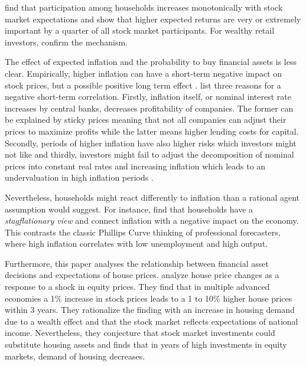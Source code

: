 \documentclass[ProjectABM]{subfiles}
\begin{document}
\cite{arrondel_et_al_2014subjective_return_expectation} find that participation among households increases monotonically with stock market expectations and \cite{choi_2020} show that higher expected returns are very or extremely important by a quarter of all stock market participants. For wealthy retail investors, \cite{giglio_et_al_2019five} confirm the mechanism.

The effect of expected inflation and the probability to buy financial assets is less clear. Empirically, higher inflation can have a short-term negative impact on stock prices, but a possible positive long term effect \citep{anari_kolari_2001inflation}. \cite{campbell_vuolteenaho_2004inflation} list three reasons for a negative short-term correlation. Firstly, inflation itself, or nominal interest rate increases by central banks, decreases profitability of companies. The former can be explained by sticky prices meaning that not all companies can adjust their prices to maximize profits while the latter means higher lending costs for capital. Secondly, periods of higher inflation have also higher risks which investors might not like and thirdly, investors might fail to adjust the decomposition of nominal prices into constant real rates and increasing inflation which leads to an undervaluation in high inflation periods \citep{modigliani_cohn1979inflation}.

Nevertheless, households might react differently to inflation than a rational agent assumption would suggest. For instance, \cite{CCG_2020_inflation_communication} find that households have a \textit{stagflationary view} and connect inflation with a negative impact on the economy. This contrasts the classic Phillips Curve thinking of professional forecasters, where high inflation correlates with low unemployment and high output. %


Furthermore, this paper analyses the relationship between financial asset decisions and expectations of house prices. \cite{sutton2002houseprices} analyze house price changes as a response to a shock in equity prices. They find that in multiple advanced economies a 1\% increase in stock prices leads to a 1 to 10\% higher house prices within 3 years. They rationalize the finding with an increase in housing demand due to a wealth effect and that the stock market reflects expectations of national income. Nevertheless, they conjecture that stock market investments could substitute housing assets and finds that in years of high investments in equity markets, demand of housing decreases. %
\end{document}
